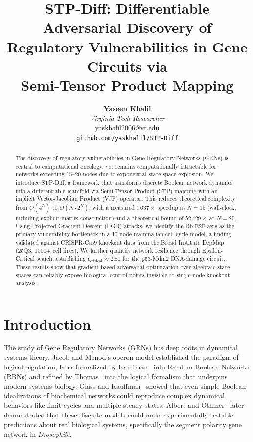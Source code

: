 \documentclass[11pt,a4paper]{article}
\title{\Large \textbf{STP-Diff: Differentiable Adversarial Discovery of\\[2pt] Regulatory Vulnerabilities in Gene Circuits via\\[2pt] Semi-Tensor Product Mapping}}
\author{\textbf{Yaseen Khalil}\\[4pt]
\textit{Virginia Tech Researcher}\\[2pt]
\href{mailto:yaskhalil2006@vt.edu}{yaskhalil2006@vt.edu}\\[4pt]
\href{https://github.com/yaskhalil/STP-Diff}{\texttt{github.com/yaskhalil/STP-Diff}}}
\date{}
\begin{document}
\maketitle
\thispagestyle{fancy}

\begin{abstract}
\noindent
The discovery of regulatory vulnerabilities in Gene Regulatory Networks (GRNs) is central to computational oncology, yet remains computationally intractable for networks exceeding 15--20 nodes due to exponential state-space explosion. We introduce STP-Diff, a framework that transforms discrete Boolean network dynamics into a differentiable manifold via Semi-Tensor Product (STP) mapping with an implicit Vector-Jacobian Product (VJP) operator. This reduces theoretical complexity from $O(4^N)$ to $O(N \cdot 2^N)$, with a measured $1\,637\times$ speedup at $N=15$ (wall-clock, including explicit matrix construction) and a theoretical bound of $52\,429\times$ at $N=20$. Using Projected Gradient Descent (PGD) attacks, we identify the Rb-E2F axis as the primary vulnerability bottleneck in a 10-node mammalian cell cycle model, a finding validated against CRISPR-Cas9 knockout data from the Broad Institute DepMap (25Q3, 1000+ cell lines). We further quantify network resilience through Epsilon-Critical search, establishing $\epsilon_{\text{critical}} \approx 2.80$ for the p53-Mdm2 DNA-damage circuit. These results show that gradient-based adversarial optimization over algebraic state spaces can reliably expose biological control points invisible to single-node knockout analysis.
\end{abstract}

\section{Introduction}
\label{sec:intro}

The study of Gene Regulatory Networks (GRNs) has deep roots in dynamical systems theory. Jacob and Monod's operon model established the paradigm of logical regulation, later formalized by Kauffman~\cite{kauffman1969metabolic} into Random Boolean Networks (RBNs) and refined by Thomas~\cite{thomas1973boolean} into the logical formalism that underpins modern systems biology. Glass and Kauffman~\cite{glass1973logical} showed that even simple Boolean idealizations of biochemical networks could reproduce complex dynamical behaviors like limit cycles and multiple steady states. Albert and Othmer~\cite{albert2003topology} later demonstrated that these discrete models could make experimentally testable predictions about real biological systems, specifically the segment polarity gene network in \textit{Drosophila}.
\end{document}
